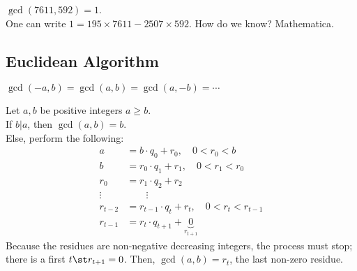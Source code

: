 \documentclass[12pt,oneside]{article}
\begin{document}
\begin{example}
  $\gcd(7611, 592) = 1$. \\
  One can write $1 = 195 \times 7611 - 2507 \times 592$. How do we know? Mathematica.
\end{example}

\subsection{Euclidean Algorithm}

\begin{remark}
  $\gcd(-a,b) = \gcd(a,b) =\gcd(a,-b) = \cdots$
\end{remark}
\begin{theorem}
  Let $a,b$ be positive integers $a\geq b$. \\If $b | a$, then $\gcd(a,b) = b$.\\Else, perform the following:
  \begin{align*}
    a &= b \cdot q_0 + r_0, \quad 0 < r_0<b\\
    b &= r_0\cdot q_1 + r_1, \quad 0 < r_1 < r_0\\
    r_0 &= r_1 \cdot q_2 + r_2\\
    \vdots & \qquad \vdots\\
    r_{t-2} &= r_{t-1}\cdot q_t+r_t, \quad 0 < r_t < r_{t-1}\\
    r_{t-1}&=r_t\cdot q_{t+1} + \underbrace{0}_{r_{t+1}}
  \end{align*}
  Because the residues are non-negative decreasing integers, the process must stop; there is a first $t\st r_{t+1}=0$. Then, $\gcd(a,b) = r_t$, the last non-zero residue.\footnotemark
\end{theorem}
\end{document}
